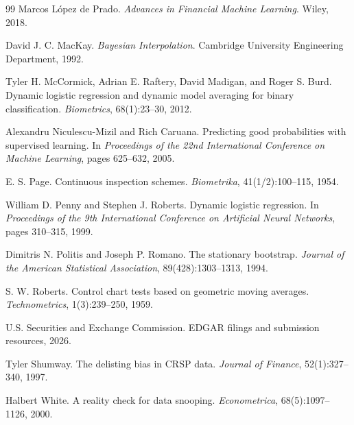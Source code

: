 \documentclass[11pt]{article}
\begin{document}
\begin{thebibliography}{99}
Marcos L{\'o}pez de Prado.
\newblock \emph{Advances in Financial Machine Learning}.
\newblock Wiley, 2018.

David J. C. MacKay.
\newblock \emph{Bayesian Interpolation}.
\newblock Cambridge University Engineering Department, 1992.

Tyler H. McCormick, Adrian E. Raftery, David Madigan, and Roger S. Burd.
\newblock Dynamic logistic regression and dynamic model averaging for binary classification.
\newblock \emph{Biometrics}, 68(1):23--30, 2012.

Alexandru Niculescu-Mizil and Rich Caruana.
\newblock Predicting good probabilities with supervised learning.
\newblock In \emph{Proceedings of the 22nd International Conference on Machine Learning}, pages 625--632, 2005.

E. S. Page.
\newblock Continuous inspection schemes.
\newblock \emph{Biometrika}, 41(1/2):100--115, 1954.

William D. Penny and Stephen J. Roberts.
\newblock Dynamic logistic regression.
\newblock In \emph{Proceedings of the 9th International Conference on Artificial Neural Networks}, pages 310--315, 1999.

Dimitris N. Politis and Joseph P. Romano.
\newblock The stationary bootstrap.
\newblock \emph{Journal of the American Statistical Association}, 89(428):1303--1313, 1994.

S. W. Roberts.
\newblock Control chart tests based on geometric moving averages.
\newblock \emph{Technometrics}, 1(3):239--250, 1959.

U.S. Securities and Exchange Commission.
\newblock EDGAR filings and submission resources, 2026.

Tyler Shumway.
\newblock The delisting bias in CRSP data.
\newblock \emph{Journal of Finance}, 52(1):327--340, 1997.

Halbert White.
\newblock A reality check for data snooping.
\newblock \emph{Econometrica}, 68(5):1097--1126, 2000.
\end{thebibliography}

\endgroup
\end{document}
